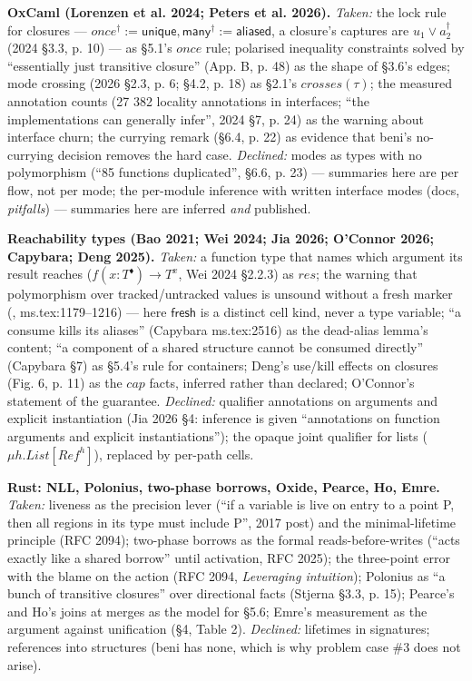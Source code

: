 \textbf{OxCaml (Lorenzen et al. 2024; Peters et al. 2026).} \emph{Taken:} the lock rule for closures — $\mathit{once}^{\dagger}\mathrel{:=}\mathsf{unique},\allowbreak{}\mathsf{many}^{\dagger}\mathrel{:=}\mathsf{aliased}$, a closure's captures are $u_{1}\vee a_{2}^{\dagger}$ (2024 §3.3, p. 10) — as §5.1's $\mathit{once}$ rule; polarised inequality constraints solved by “essentially just transitive closure” (App. B, p. 48) as the shape of §3.6's edges; mode crossing (2026 §2.3, p. 6; §4.2, p. 18) as §2.1's $\mathit{crosses}(\tau )$; the measured annotation counts (27 382 locality annotations in interfaces; “the implementations can generally infer”, 2024 §7, p. 24) as the warning about interface churn; the currying remark (§6.4, p. 22) as evidence that beni's no-currying decision removes the hard case. \emph{Declined:} modes as types with no polymorphism (“85 functions duplicated”, §6.6, p. 23) — summaries here are per flow, not per mode; the per-module inference with written interface modes (docs, \emph{pitfalls}) — summaries here are inferred \emph{and} published.

\textbf{Reachability types (Bao 2021; Wei 2024; Jia 2026; O'Connor 2026; Capybara; Deng 2025).} \emph{Taken:} a function type that names which argument its result reaches ($f(x:T^{\blacklozenge})\to T^{x}$, Wei 2024 §2.2.3) as $\mathit{res}$; the warning that polymorphism over tracked/untracked values is unsound without a fresh marker (, ms.tex:1179–1216) — here $\mathsf{fresh}$ is a distinct cell kind, never a type variable; “a consume kills its aliases” (Capybara ms.tex:2516) as the dead-alias lemma's content; “a component of a shared structure cannot be consumed directly” (Capybara §7) as §5.4's rule for containers; Deng's use/kill effects on closures (Fig. 6, p. 11) as the $\mathit{cap}$ facts, inferred rather than declared; O'Connor's statement of the guarantee. \emph{Declined:} qualifier annotations on arguments and explicit instantiation (Jia 2026 §4: inference is given “annotations on function arguments and explicit instantiations”); the opaque joint qualifier for lists ($\mu h.\mathit{List}[\mathit{Ref}^{h}]$), replaced by per-path cells.

\textbf{Rust: NLL, Polonius, two-phase borrows, Oxide, Pearce, Ho, Emre.} \emph{Taken:} liveness as the precision lever (“if a variable is live on entry to a point P, then all regions in its type must include P”, 2017 post) and the minimal-lifetime principle (RFC 2094); two-phase borrows as the formal reads-before-writes (“acts exactly like a shared borrow” until activation, RFC 2025); the three-point error with the blame on the action (RFC 2094, \emph{Leveraging intuition}); Polonius as “a bunch of transitive closures” over directional facts (Stjerna §3.3, p. 15); Pearce's and Ho's joins at merges as the model for §5.6; Emre's measurement as the argument against unification (§4, Table 2). \emph{Declined:} lifetimes in signatures; references into structures (beni has none, which is why problem case \#3 does not arise).

